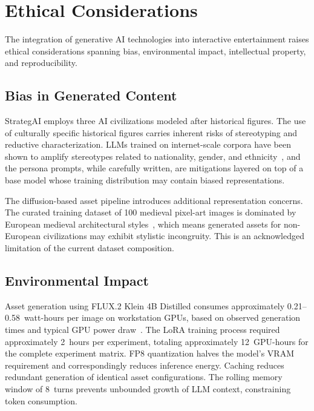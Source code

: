 \documentclass[conference]{IEEEtran}
\begin{document}
\FloatBarrier
\section{Ethical Considerations}
\label{sec:ethics}

The integration of generative AI technologies into interactive
entertainment raises ethical considerations spanning bias, environmental
impact, intellectual property, and reproducibility.

\subsection{Bias in Generated Content}

StrategAI employs three AI civilizations modeled after historical figures.
The use of culturally specific historical figures carries inherent risks of
stereotyping and reductive characterization. LLMs trained on internet-scale
corpora have been shown to amplify stereotypes related to nationality,
gender, and ethnicity~\cite{bender2021stochasticparrots}, and the persona
prompts, while carefully written, are mitigations layered on top of a base
model whose training distribution may contain biased representations.

The diffusion-based asset pipeline introduces additional representation
concerns. The curated training dataset of 100 medieval pixel-art images is
dominated by European medieval architectural
styles~\cite{crawford2019excavating}, which means generated assets for
non-European civilizations may exhibit stylistic incongruity. This is an
acknowledged limitation of the current dataset composition.

\subsection{Environmental Impact}

Asset generation using FLUX.2 Klein 4B Distilled consumes approximately
0.21--0.58~watt-hours per image on workstation GPUs, based on observed
generation times and typical GPU power
draw~\cite{strubell2019energy}. The LoRA training process required
approximately 2~hours per experiment, totaling approximately 12~GPU-hours
for the complete experiment matrix. FP8 quantization halves the model's
VRAM requirement and correspondingly reduces inference energy. Caching
reduces redundant generation of identical asset configurations. The rolling
memory window of 8~turns prevents unbounded growth of LLM context,
constraining token consumption.
\end{document}
